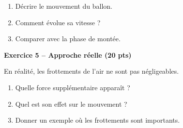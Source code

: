 \documentclass[11pt,a4paper]{article}
\begin{document}
\begin{enumerate}
\item Décrire le mouvement du ballon.
\item Comment évolue sa vitesse ?
\item Comparer avec la phase de montée.
\end{enumerate}

\bigskip

\textbf{Exercice 5 – Approche réelle (20 pts)}

En réalité, les frottements de l’air ne sont pas négligeables.

\begin{enumerate}
\item Quelle force supplémentaire apparaît ?
\item Quel est son effet sur le mouvement ?
\item Donner un exemple où les frottements sont importants.
\end{enumerate}
\end{document}
